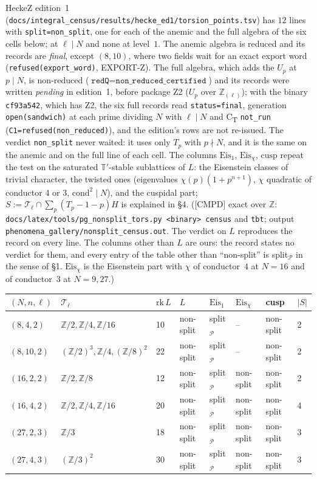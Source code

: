 \documentclass[11pt]{article}
\newcommand{\Z}{\mathbb{Z}}
\newcommand{\code}[1]{\texttt{#1}}
\newcommand{\file}[1]{\texttt{#1}}
\newcommand{\pfile}[1]{\nolinkurl{#1}}
\newcommand{\CMPD}{\textsf{\small[CMPD]}}
\begin{document}
HeckeZ edition~1 (\pfile{docs/integral_census/results/hecke_ed1/torsion_points.tsv}) has $12$ lines with \code{split=non\_split}, one for each of the anemic and the full algebra of the six cells below; at $\ell\mid N$ and none at level~$1$. The anemic algebra is reduced and its records are \emph{final}, except $(8,10)$, where two fields wait for an exact export word (\code{refused(export\_word)}, EXPORT-Z). The full algebra, which adds the $U_p$ at $p\mid N$, is non-reduced ($\code{redQ}=\code{non\_reduced\_certified}$) and its records were written \emph{pending} in edition~1, before package Z2 ($U_p$ over $\Z_{(\ell)}$); with the binary \code{cf93a542}, which has Z2, the six full records read \code{status=final}, generation \code{open(sandwich)} at each prime dividing $N$ with $\ell\mid N$ and C\textsubscript{T} \code{not\_run} (\code{C1=refused(non\_reduced)}), and the edition's rows are not re-issued. The verdict \code{non\_split} never waited: it uses only $T_p$ with $p\nmid N$, and it is the same on the anemic and on the full line of each cell. The columns $\mathrm{Eis}_1$, $\mathrm{Eis}_\chi$, $\mathrm{cusp}$ repeat the test on the saturated $\mathbb T'$-stable sublattices of $L$: the Eisenstein classes of trivial character, the twisted ones (eigenvalues $\chi(p)(1+p^{n+1})$, $\chi$ quadratic of conductor $4$ or $3$, $\mathrm{cond}^{2}\mid N$), and the cuspidal part; $S:=\mathcal T_\ell\cap\sum_p(T_p-1-p)H$ is explained in \S4. (\CMPD{} exact over $\Z$: \file{docs/latex/tools/pg\_nonsplit\_tors.py <binary> census} and \code{tbt}; output \file{phenomena\_gallery/nonsplit\_census.out}. The verdict on $L$ reproduces the record on every line. The columns other than $L$ are ours: the record states no verdict for them, and every entry of the table other than ``non-split'' is split$_{\mathcal P}$ in the sense of \S1. $\mathrm{Eis}_\chi$ is the Eisenstein part with $\chi$ of conductor~$4$ at $N=16$ and of conductor~$3$ at $N=9,27$.)
\begin{center}\small
\begin{tabular}{@{}llllllll@{}}
\toprule
$(N,n,\ell)$ & $\mathcal T_\ell$ & $\mathrm{rk}\,L$ & $L$ & $\mathrm{Eis}_1$ & $\mathrm{Eis}_\chi$ & cusp & $\lvert S\rvert$\\
\midrule
$(8,4,2)$ & $\Z/2,\Z/4,\Z/16$ & 10 & non-split & split$_{\mathcal P}$ & -- & non-split & 2 \\
$(8,10,2)$ & $(\Z/2)^3,\Z/4,(\Z/8)^2$ & 22 & non-split & split$_{\mathcal P}$ & -- & non-split & 2 \\
$(16,2,2)$ & $\Z/2,\Z/8$ & 12 & non-split & split$_{\mathcal P}$ & non-split & non-split & 2 \\
$(16,4,2)$ & $\Z/2,\Z/4,\Z/16$ & 20 & non-split & split$_{\mathcal P}$ & non-split & non-split & 4 \\
$(27,2,3)$ & $\Z/3$ & 18 & non-split & split$_{\mathcal P}$ & non-split & non-split & 3 \\
$(27,4,3)$ & $(\Z/3)^2$ & 30 & non-split & split$_{\mathcal P}$ & non-split & non-split & 3 \\
\bottomrule
\end{tabular}
\end{center}
\end{document}
